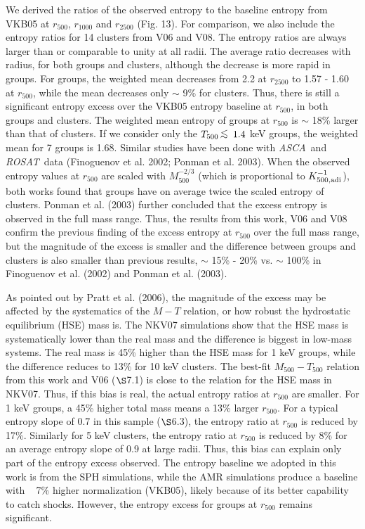 \documentclass{aastex}
\newcommand{\lsim}{\mbox{\hspace{.2em}\raisebox{.5ex}{$<$}\hspace{-.8em}\raisebox{-.5ex}{$\sim$}
\hspace{.2em}}}
\def\asca       {{\em ASCA}\/}
\def\rosat      {{\em ROSAT}\/}
\begin{document}
We derived the ratios of the observed entropy to the baseline entropy
from VKB05 at $r_{500}$, $r_{1000}$ and $r_{2500}$ (Fig. 13).
For comparison, we also include the entropy ratios
for 14 clusters from V06 and V08. The entropy ratios are always larger than or comparable
to unity at all radii. The average ratio decreases with radius, for both groups and
clusters, although the decrease is more rapid in groups. For groups, the weighted 
mean decreases from 2.2 at $r_{2500}$ to 1.57 - 1.60 at $r_{500}$, while the mean
decreases only $\sim$ 9\% for clusters. Thus, there is still a significant entropy excess
over the VKB05 entropy baseline at $r_{500}$, in both groups and clusters. The weighted mean
entropy of groups at $r_{500}$ is $\sim$ 18\% larger than that of clusters. If we consider
only the $T_{500} \lsim 1.4$ keV groups, the weighted mean for 7 groups is 1.68.
Similar studies have been done with \asca\ and \rosat\ data (Finoguenov et al. 2002;
Ponman et al. 2003). When the observed entropy values at $r_{500}$ are scaled
with $M_{500}^{-2/3}$ (which is proportional to $K_{\rm 500, adi}^{-1}$), both works
found that groups have on average twice the scaled entropy of clusters. Ponman et al. (2003)
further concluded that the excess entropy is observed in the full mass range.
Thus, the results from this work, V06 and V08 confirm the previous finding of the excess
entropy at $r_{500}$ over the full mass range, but the magnitude of the excess is smaller
and the difference between groups and clusters is also smaller than previous results,
$\sim$ 15\% - 20\% vs. $\sim$ 100\% in Finoguenov et al. (2002) and Ponman et al. (2003). 

As pointed out by Pratt et al. (2006), the magnitude of the excess may be
affected by the systematics of the $M - T$ relation, or how robust the hydrostatic
equilibrium (HSE) mass is. The NKV07 simulations show that the HSE mass is systematically
lower than the real mass and the difference is biggest in low-mass systems. The real mass
is 45\% higher than the HSE mass for 1 keV groups, while the difference reduces to
13\% for 10 keV clusters. The best-fit $M_{500} - T_{500}$ relation from this work and
V06 ($\S$7.1) is close to the relation for the HSE mass in NKV07. Thus, if this
bias is real, the actual entropy ratios at $r_{500}$ are smaller. For 1 keV groups,
a 45\% higher total mass means a 13\% larger $r_{500}$. For a typical entropy slope of
0.7 in this sample ($\S$6.3), the entropy ratio at $r_{500}$ is reduced by 17\%. Similarly
for 5 keV clusters, the entropy ratio at $r_{500}$ is reduced by 8\% for an average entropy
slope of 0.9 at large radii. Thus, this bias can explain only part of the entropy excess
observed. The entropy baseline we adopted in this work is from the SPH simulations,
while the AMR simulations produce a baseline with ~ 7\% higher normalization (VKB05),
likely because of its better capability to catch shocks. However, the entropy excess
for groups at $r_{500}$ remains significant.
\end{document}
